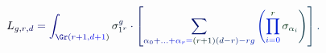 \documentclass[12pt]{article}
\begin{document}
\makeatletter
\renewcommand*{\@textcolor}[3]{%
  \protect\leavevmode
  \begingroup
    \color#1{#2}#3%
  \endgroup
}
\makeatother
\begin{displaymath}
\mathcolor[RGB]{0,0,15}{L} _ { \mathcolor[RGB]{0,0,30}{g} \mathcolor[RGB]{0,0,45}{,} \mathcolor[RGB]{0,0,60}{r} \mathcolor[RGB]{0,0,75}{,} \mathcolor[RGB]{0,0,90}{d} } \mathcolor[RGB]{0,0,105}{=} \mathcolor[RGB]{0,0,120}{\int} _ { \mathcolor[RGB]{0,0,135}{\Gr} \mathcolor[RGB]{0,0,150}{(} \mathcolor[RGB]{0,0,165}{r} \mathcolor[RGB]{0,0,180}{+} \mathcolor[RGB]{0,0,195}{1} \mathcolor[RGB]{0,0,210}{,} \mathcolor[RGB]{0,0,225}{d} \mathcolor[RGB]{0,0,240}{+} \mathcolor[RGB]{0,0,255}{1} \mathcolor[RGB]{0,15,0}{)} } \mathcolor[RGB]{0,15,15}{\sigma} _ { \mathcolor[RGB]{0,15,30}{1} ^ { \mathcolor[RGB]{0,15,45}{r} } } ^ { \mathcolor[RGB]{0,15,60}{g} } \mathcolor[RGB]{0,15,75}{\cdot} \mathcolor[RGB]{0,15,90}{\left[} \mathcolor[RGB]{0,15,105}{\sum} _ { \mathcolor[RGB]{0,15,120}{\alpha} _ { \mathcolor[RGB]{0,15,135}{0} } \mathcolor[RGB]{0,15,150}{+} \mathcolor[RGB]{0,15,165}{.} \mathcolor[RGB]{0,15,180}{.} \mathcolor[RGB]{0,15,195}{.} \mathcolor[RGB]{0,15,210}{+} \mathcolor[RGB]{0,15,225}{\alpha} _ { \mathcolor[RGB]{0,15,240}{r} } \mathcolor[RGB]{0,15,255}{=} \mathcolor[RGB]{0,30,0}{(} \mathcolor[RGB]{0,30,15}{r} \mathcolor[RGB]{0,30,30}{+} \mathcolor[RGB]{0,30,45}{1} \mathcolor[RGB]{0,30,60}{)} \mathcolor[RGB]{0,30,75}{(} \mathcolor[RGB]{0,30,90}{d} \mathcolor[RGB]{0,30,105}{-} \mathcolor[RGB]{0,30,120}{r} \mathcolor[RGB]{0,30,135}{)} \mathcolor[RGB]{0,30,150}{-} \mathcolor[RGB]{0,30,165}{r} \mathcolor[RGB]{0,30,180}{g} } \mathcolor[RGB]{0,30,195}{\left(} \mathcolor[RGB]{0,30,210}{\prod} _ { \mathcolor[RGB]{0,30,225}{i} \mathcolor[RGB]{0,30,240}{=} \mathcolor[RGB]{0,30,255}{0} } ^ { \mathcolor[RGB]{0,45,0}{r} } \mathcolor[RGB]{0,45,15}{\sigma} _ { \mathcolor[RGB]{0,45,30}{\alpha} _ { \mathcolor[RGB]{0,45,45}{i} } } \mathcolor[RGB]{0,45,60}{\right)} \mathcolor[RGB]{0,45,75}{\right]} \mathcolor[RGB]{0,45,90}{.}
\end{displaymath}
\end{document}
